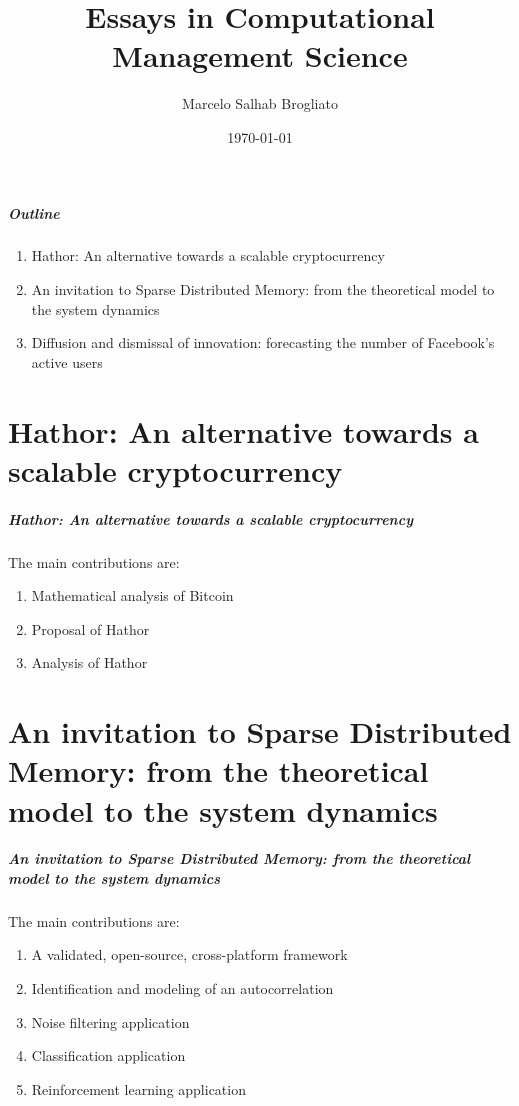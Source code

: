 \documentclass{beamer}
\title{Essays in Computational Management Science}
\author{Marcelo Salhab Brogliato}
\institute{EBAPE / FGV}
\date{\today}
\begin{document}
\begin{frame}
\titlepage
\end{frame}

\begin{frame}
\frametitle{Outline}
\begin{enumerate}[I]
\item Hathor: An alternative towards a scalable cryptocurrency
\item An invitation to Sparse Distributed Memory: from the theoretical model to the system dynamics
\item Diffusion and dismissal of innovation: forecasting the number of Facebook’s active users
\end{enumerate}
\end{frame}


\part{Hathor: An alternative towards a scalable cryptocurrency}
\begin{frame}
\frametitle{Hathor: An alternative towards a scalable cryptocurrency}

The main contributions are:
\begin{enumerate}[i]
\item Mathematical analysis of Bitcoin
\item Proposal of Hathor
\item Analysis of Hathor
\end{enumerate}
\end{frame}


\part{An invitation to Sparse Distributed Memory: from the theoretical model to the system dynamics}
\begin{frame}
\frametitle{An invitation to Sparse Distributed Memory: from the theoretical model to the system dynamics}

The main contributions are:
\begin{enumerate}[i]
\item A validated, open-source, cross-platform framework
\item Identification and modeling of an autocorrelation
\item Noise filtering application
\item Classification application
\item Reinforcement learning application
\end{enumerate}
\end{frame}
\end{document}
